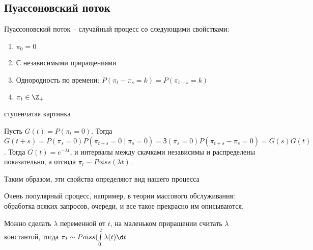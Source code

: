 \subsection{Пуассоновский поток}
\begin{Def}
Пуассоновский поток -- случайный процесс со следующими свойствами:
\begin{enumerate}
\item $\pi_0 = 0$
\item С независимыми приращениями
\item Однородность по времени: $P(\pi_t - \pi_s = k) = P(\pi_{t-s} = k)$
\item $\pi_t \in \Z_+$
\end{enumerate}
\end{Def}
\TODO ступенчатая картинка \TODO

Пусть $G(t) = P(\pi_t = 0)$. Тогда $G(t + s) = P(\pi_s = 0) P(\pi_{t + s} = 0 \mid \pi_s = 0) = З(\pi_s = 0) P(\pi_{t + s} - \pi_s = 0) = G(s) G(t)$.
Тогда $G(t) = e^{-\lambda t}$, и интервалы между скачками независимы и распределены показательно, а отсюда $\pi_t \sim Poiss(\lambda t)$.

Таким образом, эти свойства определяют вид нашего процесса

\begin{Rem}
Очень популярный процесс, например, в теории массового обслуживания: обработка всяких запросов, очереди, и все такое прекрасно им описываются.
\end{Rem}

Можно сделать $\lambda$ переменной от $t$, на маленьком приращении считать $\lambda$ константой, тогда $\pi_t \sim Poiss(\int\limits_0^t \lambda(t) \d t$
